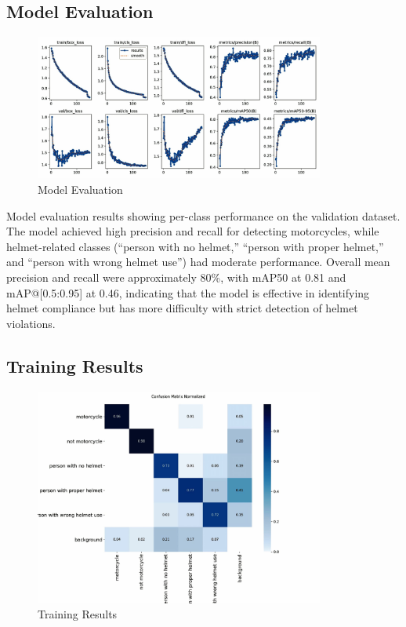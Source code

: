 \begin{refsection}
\subsection{Model Evaluation}
\begin{figure}[ht]
    \centering
	\includegraphics[width=0.85\textwidth]{figures/Fig 14.jpg}
	\caption[Model Evaluation]{Model Evaluation}
	\label{fig:model_evaluation}
\end{figure}

\noindent
Model evaluation results showing per-class performance on the validation dataset. The model achieved high precision and recall for detecting motorcycles, while helmet-related classes (“person with no helmet,” “person with proper helmet,” and “person with wrong helmet use”) had moderate performance. Overall mean precision and recall were approximately 80\%, with mAP50 at 0.81 and mAP@[0.5:0.95] at 0.46, indicating that the model is effective in identifying helmet compliance but has more difficulty with strict detection of helmet violations.

\subsection{Training Results}
\begin{figure}[ht]
    \centering
	\includegraphics[width=0.85\textwidth]{figures/Fig 15.jpg}
	\caption[Training Results]{Training Results}
	\label{fig:training_results}
\end{figure}


\end{refsection}
